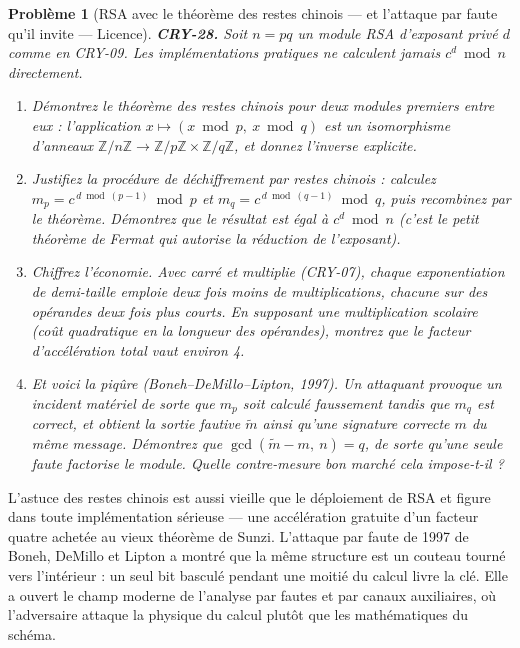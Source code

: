 \documentclass[11pt]{article}
\newtheorem{problem}{Problème}
\begin{document}
\bigskip

\begin{problem}[{RSA avec le théorème des restes chinois --- et l'attaque par faute qu'il invite --- Licence}]
\textbf{CRY-28.} Soit $n = pq$ un module RSA d'exposant privé $d$ comme
en CRY-09. Les implémentations pratiques ne calculent jamais $c^d \bmod n$ directement.
\begin{enumerate}
\item[(a)] Démontrez le théorème des restes chinois pour deux modules premiers entre eux :
l'application $x \mapsto (x \bmod p,\ x \bmod q)$ est un isomorphisme d'anneaux
$\mathbb{Z}/n\mathbb{Z} \to \mathbb{Z}/p\mathbb{Z} \times \mathbb{Z}/q\mathbb{Z}$,
et donnez l'inverse explicite.
\item[(b)] Justifiez la procédure de déchiffrement par restes chinois : calculez
$m_p = c^{\,d \bmod (p-1)} \bmod p$ et $m_q = c^{\,d \bmod (q-1)} \bmod q$,
puis recombinez par le théorème. Démontrez que le résultat est égal à $c^d \bmod n$ (c'est
le petit théorème de Fermat qui autorise la réduction de l'exposant).
\item[(c)] Chiffrez l'économie. Avec \og{} carré et multiplie \fg{} (CRY-07), chaque exponentiation de
demi-taille emploie deux fois moins de multiplications, chacune sur des opérandes deux fois
plus courts. En supposant une multiplication scolaire (coût quadratique en la longueur des
opérandes), montrez que le facteur d'accélération total vaut environ 4.
\item[(d)] Et voici la piqûre (Boneh--DeMillo--Lipton, 1997). Un attaquant provoque un incident
matériel de sorte que $m_p$ soit calculé faussement tandis que $m_q$ est correct, et
obtient la sortie fautive $\tilde m$ ainsi qu'une signature correcte $m$ du même message.
Démontrez que $\gcd(\tilde m - m,\ n) = q$, de sorte qu'une seule faute factorise le
module. Quelle contre-mesure bon marché cela impose-t-il ?
\end{enumerate}

\end{problem}

\noindent L'astuce des restes chinois est aussi vieille que le déploiement de RSA et
figure dans toute implémentation sérieuse --- une accélération gratuite d'un facteur quatre
achetée au vieux théorème de Sunzi. L'attaque par faute de 1997 de Boneh, DeMillo et Lipton
a montré que la même structure est un couteau tourné vers l'intérieur : un seul bit basculé
pendant une moitié du calcul livre la clé. Elle a ouvert le champ moderne de l'analyse par
fautes et par canaux auxiliaires, où l'adversaire attaque la physique du calcul plutôt que
les mathématiques du schéma.
\end{document}
